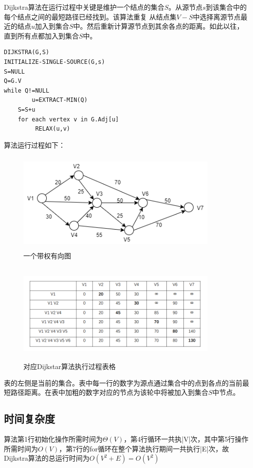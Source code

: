 Dijkstra算法在运行过程中关键是维护一个结点的集合$S$。从源节点$s$到该集合中的每个结点之间的最短路径已经找到。该算法重复
从结点集$V-S$中选择离源节点最近的结点$u$加入到集合$S$中。然后重新计算源节点到其余各点的距离。如此以往，直到所有点都加入到集合$S$中。

\begin{lstlisting}[caption=Dijkstra算法伪代码]
DIJKSTRA(G,S)
INITIALIZE-SINGLE-SOURCE(G,s)
S=NULL
Q=G.V
while Q!=NULL
        u=EXTRACT-MIN(Q)
	S=S+u
	for each vertex v in G.Adj[u]
		 RELAX(u,v)
\end{lstlisting}

算法运行过程如下：

\begin{figure}
\centering
\includegraphics[width=10cm,height=5cm]{image/dijkstra1.png}
\caption{一个带权有向图}
\end{figure}
\begin{figure}
\centering
\includegraphics[width=10cm,height=5cm]{image/dijkstra2.png}
\caption{对应Dijkstar算法执行过程表格}
\end{figure}

表的左侧是当前的集合。表中每一行的数字为源点通过集合中的点到各点的当前最短路径距离。在表中加粗的数字对应的节点为该轮中将被加入到集合$S$中节点。

\subsection{时间复杂度}
算法第1行初始化操作所需时间为$\Theta(V)$，第4行循环一共执|V|次，其中第5行操作所需时间为$O(V)$，第7行的for循环在整个算法执行期间一共执行|E|次，故Dijkstra算法的总运行时间为$O(V^2+E)=O(V^2)$

